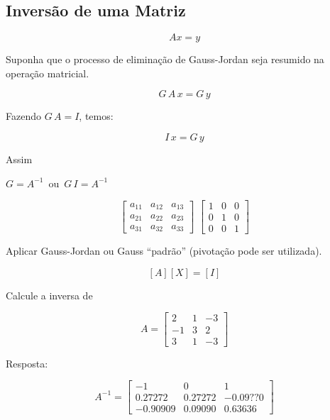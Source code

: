 \subsection{Inversão de uma Matriz}

\[ Ax = y\]

Suponha que o processo de eliminação de Gauss-Jordan seja resumido na operação matricial.

\[ G \, A \, x = G \, y \]

Fazendo $G \, A = I$, temos:

\[ I \, x = G \, y \]

Assim

\begin{center}
$ G = A^{-1} \,$ ou $\, G \, I = A^{-1} $
\end{center}

\[
 \left[
  \begin{array}{ccc}
    a_{11} & a_{12} & a_{13}\\
    a_{21} & a_{22} & a_{23}\\
    a_{31} & a_{32} & a_{33}
  \end{array}
 \right]
  \,\,
\left[
  \begin{array}{ccc}
    1 & 0 & 0\\
    0 & 1 & 0\\
    0 & 0 & 1
  \end{array}
 \right]
\]

Aplicar Gauss-Jordan ou Gauss ``padrão'' (pivotação pode ser utilizada).

\[ [A][X] = [I] \]

\begin{example}

Calcule a inversa de

\[
 A =
  \left[
  \begin{array}{ccc}
    2 & 1 & -3\\
    -1 & 3 & 2\\
    3 & 1 & -3
  \end{array}
  \right]
\]

Resposta:

\[
 A^{-1} =
  \left[
  \begin{array}{ccc}
    -1 & 0 & 1\\
    0.27272 & 0.27272 & -0.09??0\\
    -0.90909 & 0.09090 & 0.63636
  \end{array}
  \right]
\]

\end{example}
